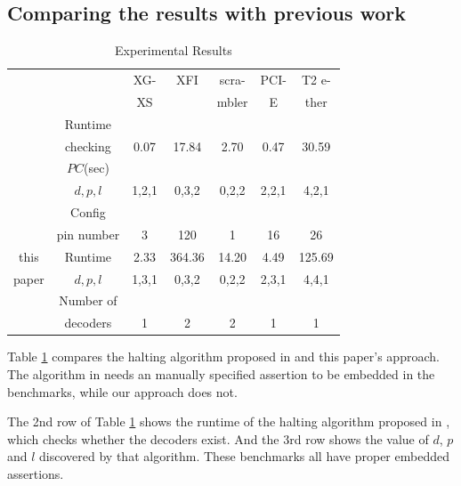 \documentclass[journal]{IEEEtran}
\begin{document}
\subsection{Comparing the results with previous work}

\begin{table}[t]
\centering
\caption{Experimental Results}
\begin{tabular}{|c|c|c|c|c|c|c|}
\hline
&                                        &XG-     &XFI       &scra-     &PCI-    &T2 e-\\
&                                        &XS      &          &mbler     &E         &ther\\\hline
&Runtime                           &&&&&\\
&checking                    &0.07     &17.84     &2.70      &0.47    &30.59       \\
\cite{ShengYuShen:tcad11}&$PC$(sec)     &&&&&\\\cline{2-7}
&$d,p,l$                                 &1,2,1    &0,3,2     &0,2,2     &2,2,1   &4,2,1         \\ \hline\hline
&Config                 &&&&&\\
&pin number                              &3        &120       &1         &16      &26\\\cline{2-7}
this&Runtime                            &2.33     &364.36    &14.20      &4.49   &125.69      \\\cline{2-7}
paper&$d,p,l$                                 &1,3,1    &0,3,2     &0,2,2     &2,3,1   &4,4,1          \\ \cline{2-7}
&Number of                                 &&&&&          \\
&decoders                                 &1       &2         &2        &1      &1          \\ \hline
\end{tabular}\label{tab_res}
\end{table}

Table \ref{tab_res} compares the halting algorithm proposed in \cite{ShengYuShen:tcad11} and this paper's approach.
The algorithm in \cite{ShengYuShen:tcad11} needs an manually specified assertion to be embedded in the benchmarks,
while our approach does not.

The 2nd row of Table \ref{tab_res} shows the runtime of
the halting algorithm proposed in \cite{ShengYuShen:tcad11},
which checks whether the decoders exist.
And the 3rd row shows the value of $d$, $p$ and $l$ discovered by that algorithm.
These benchmarks all have proper embedded assertions.
\end{document}

